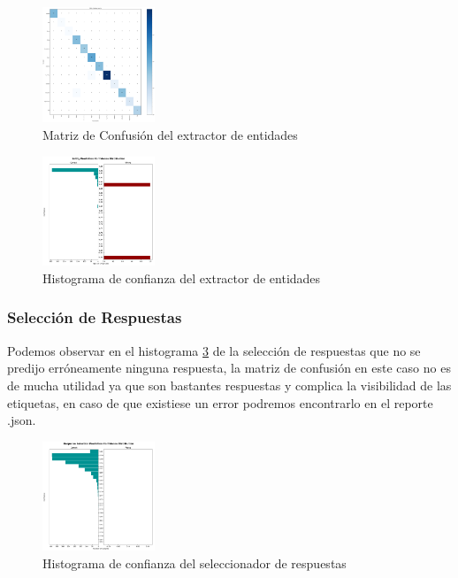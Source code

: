 \begin{figure}[H]
	\centering
	\includegraphics[angle=0,width=0.3\textwidth]{Figuras/DIETClassifier_confusion_matrix.png}
	\caption{Matriz de Confusión del extractor de entidades}
	\label{fig:entity_matriz}
\end{figure}

\begin{figure}[H]
	\centering
	\includegraphics[angle=0,width=0.3\textwidth]{Figuras/DIETClassifier_histogram.png}
	\caption{Histograma de confianza del extractor de entidades}
	\label{fig:entity_histograma}
\end{figure}

\subsubsection{Selección de Respuestas}
Podemos observar en el histograma \ref{fig:response_histograma} de la selección de respuestas que
no se predijo erróneamente ninguna respuesta, la matriz de confusión en este caso no es de mucha
utilidad ya que son bastantes respuestas y complica la visibilidad de las etiquetas, en caso de que
existiese un error podremos encontrarlo en el reporte .json.

\begin{figure}[H]
	\centering
	\includegraphics[angle=0,width=0.3\textwidth]{Figuras/response_selection_histogram.png}
	\caption{Histograma de confianza del seleccionador de respuestas}
	\label{fig:response_histograma}
\end{figure}
